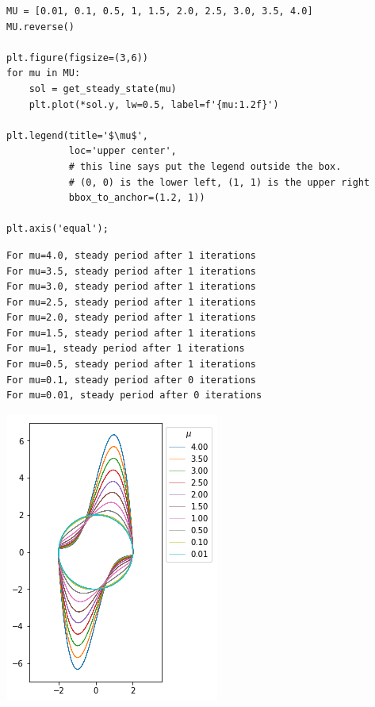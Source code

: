 \documentclass[11pt]{article}
\begin{document}
\begin{verbatim}
MU = [0.01, 0.1, 0.5, 1, 1.5, 2.0, 2.5, 3.0, 3.5, 4.0]
MU.reverse()

plt.figure(figsize=(3,6))
for mu in MU:
    sol = get_steady_state(mu)
    plt.plot(*sol.y, lw=0.5, label=f'{mu:1.2f}')

plt.legend(title='$\mu$',
           loc='upper center',
           # this line says put the legend outside the box.
           # (0, 0) is the lower left, (1, 1) is the upper right
           bbox_to_anchor=(1.2, 1))

plt.axis('equal');
\end{verbatim}

\begin{verbatim}
For mu=4.0, steady period after 1 iterations
For mu=3.5, steady period after 1 iterations
For mu=3.0, steady period after 1 iterations
For mu=2.5, steady period after 1 iterations
For mu=2.0, steady period after 1 iterations
For mu=1.5, steady period after 1 iterations
For mu=1, steady period after 1 iterations
For mu=0.5, steady period after 1 iterations
For mu=0.1, steady period after 0 iterations
For mu=0.01, steady period after 0 iterations

\end{verbatim}


\begin{center}
\includegraphics[width=.9\linewidth]{obipy-resources/c515c00ecd6370edf5b32608ff70731e-38847ruq.png}
\end{center}
\end{document}
